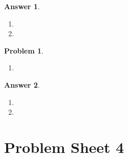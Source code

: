 \documentclass[a4paper]{article}
\newtheorem{ans}{Answer}[subsection]
\theoremstyle{new}
\newtheorem{qns}{Problem}[section]
\begin{document}
\begin{ans}\leavevmode
\begin{enumerate}[label=(\alph*)]
\item

\item 
\end{enumerate}
\end{ans}
\newpage
\begin{qns}\leavevmode
\begin{enumerate}[label=(\alph*)]
\item 

\end{enumerate}
\end{qns}
\begin{ans}\leavevmode
\begin{enumerate}[label=(\alph*)]
\item

\item 
\end{enumerate}
\end{ans}
\newpage
\section{Problem Sheet 4}
\end{document}
